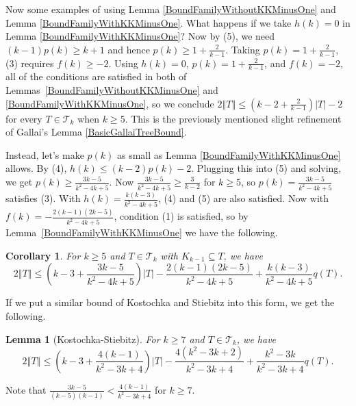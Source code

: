 \documentclass[12pt]{article}
\theoremstyle{plain}
\newtheorem{lem}[thm]{Lemma}
\newtheorem{cor}[thm]{Corollary}
\theoremstyle{definition}
\theoremstyle{remark}
\newcommand{\fancy}[1]{\mathcal{#1}}
\newcommand{\T}{\fancy{T}}
\newcommand{\card}[1]{\left|#1\right|}
\newcommand{\size}[1]{\left\Vert#1\right\Vert}
\newcommand{\parens}[1]{\left( #1 \right)}
\begin{document}
Now some examples of using Lemma \ref{BoundFamilyWithoutKKMinusOne} and Lemma \ref{BoundFamilyWithKKMinusOne}.  What happens if we take $h(k) = 0$ in Lemma \ref{BoundFamilyWithKKMinusOne}?  Now by (5), we need $(k-1)p(k) \ge k + 1$ and hence $p(k) \ge 1 + \frac{2}{k-1}$.  Taking $p(k) = 1 + \frac{2}{k-1}$, (3) requires $f(k) \ge -2$.  Using $h(k)=0$, $p(k)=1+\frac2{k-1}$, and $f(k) = -2$, all of the conditions are satisfied in both of Lemmas~\ref{BoundFamilyWithoutKKMinusOne} and \ref{BoundFamilyWithKKMinusOne}, so we conclude $2\size{T} \le \parens{k-2 + \frac{2}{k-1}}\card{T} - 2$ for every $T \in \T_k$ when $k \ge 5$.  This is the previously mentioned slight refinement of Gallai's Lemma \ref{BasicGallaiTreeBound}.

Instead, let's make $p(k)$ as small as Lemma \ref{BoundFamilyWithKKMinusOne} allows. By (4), $h(k) \le (k-2)p(k) - 2$. Plugging 
this into (5) and solving, we get $p(k) \ge \frac{3k-5}{k^2 - 4k + 5}$.  Now $\frac{3k-5}{k^2 - 4k + 5} \ge \frac{3}{k-2}$ 
for $k \ge 5$, so $p(k) = \frac{3k-5}{k^2 - 4k + 5}$ satisfies (3).  With $h(k) = \frac{k(k-3)}{k^2 - 4k + 5}$, (4) and (5) 
are also satisfied. Now with $f(k) = -\frac{2(k-1)(2k-5)}{k^2 - 4k + 5}$, condition (1) is satisfied, so by 
Lemma~\ref{BoundFamilyWithKKMinusOne} we have the following.

\begin{cor}\label{SmallP}
	For $k \ge 5$ and $T \in \T_k$ with $K_{k-1} \subseteq T$, we have
	\[2\size{T} \le \parens{k-3 + \frac{3k-5}{k^2 - 4k + 5}}\card{T} - \frac{2(k-1)(2k-5)}{k^2 - 4k + 5} + 
	\frac{k(k-3)}{k^2 - 4k + 5}q(T).\]
\end{cor}

If we put a similar bound of Kostochka and Stiebitz into this form, we get the following.
\begin{lem}[Kostochka-Stiebitz]
		For $k \ge 7$ and $T \in \T_k$, we have
		\[2\size{T} \le \parens{k-3 + \frac{4(k-1)}{k^2 - 3k + 4}}\card{T} - \frac{4(k^2-3k+2)}{k^2-3k+4} + 
		\frac{k^2 - 3k}{k^2-3k+4}q(T).\]
\end{lem}





\noindent
Note that $\frac{3k-5}{(k-5)(k-1)} < \frac{4(k-1)}{k^2 - 3k + 4}$ for $k \ge 7$.
\end{document}
